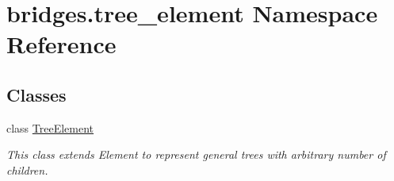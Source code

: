 \hypertarget{namespacebridges_1_1tree__element}{}\section{bridges.\+tree\+\_\+element Namespace Reference}
\label{namespacebridges_1_1tree__element}
\subsection*{Classes}
\begin{DoxyCompactItemize}
\item 
class \mbox{\hyperlink{classbridges_1_1tree__element_1_1_tree_element}{Tree\+Element}}
\begin{DoxyCompactList}\small\item\em This class extends Element to represent general trees with arbitrary number of children. \end{DoxyCompactList}\end{DoxyCompactItemize}
